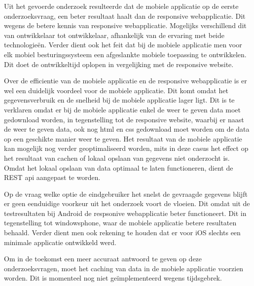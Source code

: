 Uit het gevoerde onderzoek resulteerde dat de mobiele applicatie op de eerste onderzoeksvraag, een beter resultaat haalt dan de responsive
webapplicatie. Dit wegens de betere kennis van responsive webapplicatie. Mogelijks verschillend dit van ontwikkelaar tot ontwikkelaar,
afhankelijk van de ervaring met beide technologieën. Verder dient ook het feit dat bij de mobiele applicatie men voor elk mobiel besturingssysteem
een afgeslankte mobiele toepassing te ontwikkelen. Dit doet de ontwikkeltijd oplopen in vergelijking met de responsive website.

Over de efficientie van de mobiele applicatie en de responsive webapplicatie is er wel een duidelijk voordeel voor de mobiele applicatie.
Dit komt omdat het gegevensverbruik en de snelheid bij de mobiele applicatie lager ligt. Dit is te verklaren omdat er bij de mobiele applicatie
enkel de weer te geven data moet gedownload worden, in tegenstelling tot de responsive website, waarbij er naast de weer te geven data, ook nog html
en css gedownload moet worden om de data op een geschikte manier weer te geven. Het resultaat van de mobiele applicatie kan mogelijk nog verder geoptimaliseerd worden,
mits in deze casus het effect op het resultaat van cachen of lokaal opslaan van gegevens niet onderzocht is. Omdat het lokaal opslaan van data optimaal te laten functioneren,
dient de REST api aangepast te worden.

Op de vraag welke optie de eindgebruiker het snelst de gevraagde gegevens blijft er geen eenduidige voorkeur uit het onderzoek voort de vloeien.
Dit omdat uit de testresultaten bij Android de respsonive webapplicatie beter functioneert. Dit in tegenstelling tot windowsphone, waar de mobiele applicatie betere
resultaten behaald. Verder dient men ook rekening te houden dat er voor iOS slechts een minimale applicatie ontwikkeld werd.

Om in de toekomst een meer accuraat antwoord te geven op deze onderzoeksvragen, moet het caching van data in de mobiele applicatie voorzien worden.
Dit is momenteel nog niet geïmplementeerd wegens tijdsgebrek.
